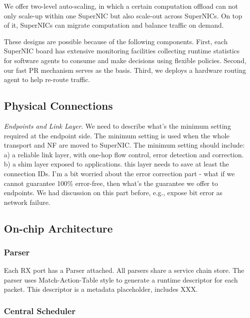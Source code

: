We offer two-level auto-scaling, in which a certain computation offload
can not only scale-up within one SuperNIC
but also scale-out across SuperNICs.
On top of it, SuperNICs can migrate computation and balance traffic on demand.

These designs are possible because of the following components.
First, each SuperNIC board has extensive monitoring facilities collecting runtime statistics for software agents to consume and make decisions using flexible policies.
Second, our fast PR mechanism serves as the basis.
Third, we deploys a hardware routing agent to help re-route traffic.

\subsection{Physical Connections}

\textit{Endpoints and Link Layer}.
We need to describe what's the minimum setting required at the endpoint side. The minimum setting is used when the whole transport and NF are moved to SuperNIC.
The minimum setting should include: a) a reliable link layer, with one-hop flow control, error detection and correction. b) a shim layer exposed to applications. this layer needs to save at least the connection IDs.
I'm a bit worried about the error correction part - what if we cannot guarantee
100\% error-free, then what's the guarantee we offer to endpoints.
We had discussion on this part before, e.g., expose bit error as network failure.

\subsection{On-chip Architecture}


\subsubsection{Parser}
Each RX port has a Parser attached. All parsers share a service chain store.
The parser uses Match-Action-Table style to generate a runtime
descriptor for each packet.
This descriptor is a metadata placeholder, includes XXX.

\subsubsection{Central Scheduler}


